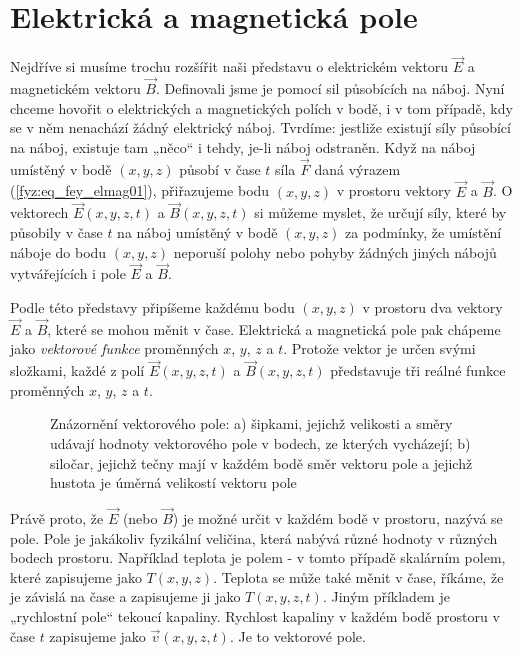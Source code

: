   \section{Elektrická a magnetická pole}
    Nejdříve si musíme trochu rozšířit naši představu o elektrickém vektoru \(\vec{E}\) a
    magnetickém vektoru \(\vec{B}\). Definovali jsme je pomocí sil působících na náboj. Nyní chceme
    hovořit o elektrických a magnetických polích v bodě, i v tom případě, kdy se v něm nenachází
    žádný elektrický náboj. Tvrdíme: jestliže existují síly působící na náboj, existuje tam „něco“ i
    tehdy, je-li náboj odstraněn. Když na náboj umístěný v bodě \((x, y, z)\) působí v čase \(t\)
    síla \(\vec{F}\) daná výrazem (\ref{fyz:eq_fey_elmag01}), přiřazujeme bodu \((x, y, z)\) v
    prostoru vektory \(\vec{E}\) a \(\vec{B}\). O vektorech \(\vec{E}(x,y, z, t)\) a \(\vec{B}(x, y,
    z, t)\) si můžeme myslet, že určují síly, které by působily v čase \(t\) na náboj umístěný v
    bodě \((x, y, z)\) za podmínky, že umístění náboje do bodu \((x, y, z)\) neporuší polohy nebo
    pohyby žádných jiných nábojů vytvářejících i pole \(\vec{E}\) a \(\vec{B}\).
  
    Podle této představy připíšeme každému bodu \((x, y, z)\) v prostoru dva vektory \(\vec{E}\) a
    \(\vec{B}\), které se mohou měnit v čase. Elektrická a magnetická pole pak chápeme jako
    \emph{vektorové funkce} proměnných \(x\), \(y\), \(z\) a \(t\). Protože vektor je určen svými
    složkami, každé z polí \(\vec{E}(x, y, z, t)\) a \(\vec{B}(x, y, z, t)\) představuje tři reálné
    funkce proměnných \(x\), \(y\), \(z\) a \(t\).
    
    \begin{figure}[ht!]
      \centering
      \caption{Znázornění vektorového pole: a) šipkami, jejichž velikosti a směry  udávají hodnoty
              vektorového pole v bodech, ze kterých vycházejí; b) siločar, jejichž tečny mají v
              každém bodě směr vektoru pole a jejichž hustota je úměrná velikostí vektoru pole
              \cite[s.~17]{Feynman02}}
      \label{fyz:fig0146}
    \end{figure} 
    Právě proto, že \(\vec{E}\) (nebo \(\vec{B}\)) je možné určit v každém bodě v prostoru, nazývá
    se pole. Pole je jakákoliv fyzikální veličina, která nabývá různé hodnoty v různých bodech
    prostoru. Například teplota je polem - v tomto případě skalárním polem, které zapisujeme jako
    \(T(x, y, z)\). Teplota se může také měnit v čase, říkáme, že je závislá na čase a zapisujeme ji
    jako \(T(x, y, z, t)\). Jiným příkladem  je „rychlostní pole“ tekoucí kapaliny. Rychlost
    kapaliny v každém bodě prostoru v čase \(t\) zapisujeme jako \(\vec{v}(x, y, z, t)\). Je to
    vektorové pole.
  
